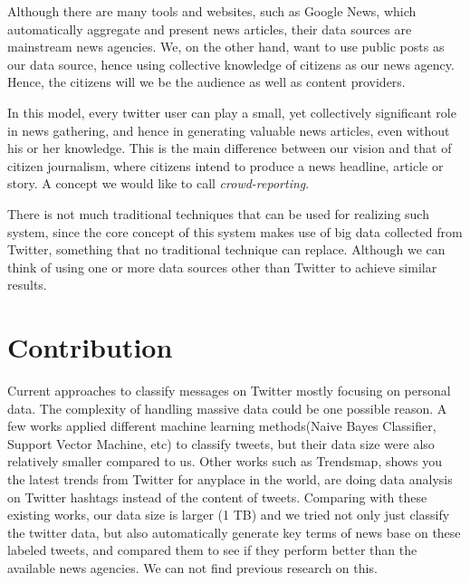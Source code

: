 \documentclass{llncs}
\begin{document}
Although there are many tools and websites, such as Google News, which automatically aggregate and present news articles, their data sources are  mainstream news agencies. We, on the other hand, want to use public posts as our data source, hence using collective knowledge of citizens as our news agency. Hence, the citizens will we be the audience as well as content providers.

In this model, every twitter user can play a small, yet collectively significant role in news gathering, and hence in generating valuable news articles, even without his or her knowledge. This is the main difference between our vision and that of citizen journalism, where citizens intend to produce a news headline, article or story. A concept we would like to call \textit{crowd-reporting}.

There is not much traditional techniques that can be used for realizing such system, since the core concept of this system makes use of big data collected from Twitter, something that no traditional technique can replace. Although we can think of using one or more data sources other than Twitter to achieve similar results.

\section{Contribution}

Current approaches to classify messages on Twitter mostly focusing on personal data. The complexity of handling massive data could be one possible reason. A few works\cite{Go_Bhayani_Huang_2009}\cite{twitter-classifier} applied different machine learning methods(Naive Bayes Classifier, Support Vector Machine, etc) to classify tweets, but their data size were also relatively smaller compared to us. Other works such as Trendsmap\cite{Trendmap}, shows you the latest trends from Twitter for anyplace in the world, are doing data analysis on Twitter hashtags instead of the content of tweets. Comparing with these existing works, our data size is larger (1 TB) and we tried not only just classify the twitter data, but also automatically generate key terms of news base on these labeled tweets, and compared them to see if they perform better than the available news agencies. We can not find previous research on this.
\end{document}
